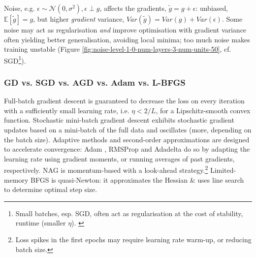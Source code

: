 Noise, e.g. $\epsilon \sim \mathcal{N}(0, \sigma^2), \epsilon \perp g$,
affects the gradients, $\tilde{g} = g + \epsilon$:
unbiased, $\mathbb{E}[\tilde{g}] = g$,
but higher \textit{gradient} variance, $Var(\tilde{g}) = Var(g) + Var(\epsilon)$.
Some noise may act as regularisation \textit{and} improve optimisation \citep{neelakantan2015addinggradientnoiseimproves}
with gradient variance often yielding better generalisation, avoiding local minima;
too much noise makes training unstable (Figure \ref{fig:noise-level-1-0-num-layers-3-num-units-50}, cf. SGD\footnote{
    Small batches, esp. SGD, often act as regularisation at the cost of stability, runtime (smaller $\eta$). \citep{Goodfellowetal2016}
}).

\subsubsection{GD vs. SGD vs. AGD vs. Adam vs. L-BFGS}
\label{subsubsection:gd-vs-sgd-vs-agd-vs-adam-vs-lbfgs}

Full-batch gradient descent is guaranteed to decrease the loss on every iteration
with a sufficiently small learning rate, i.e. $\eta < 2 / L$,
for a Lipschitz-smooth convex function.
Stochastic mini-batch gradient descent exhibits stochastic gradient updates
based on a mini-batch of the full data and oscillates (more, depending on the batch size).
Adaptive methods and second-order approximations are designed to accelerate convergence:
Adam \citep{kingma2017adammethodstochasticoptimization}, RMSProp \citep{hinton2012rmsprop} and Adadelta \citep{zeiler2012adadeltaadaptivelearningrate}
do so by adapting the learning rate using gradient moments,
or running averages of past gradients, respectively.
NAG \citep{nesterov1983method} is momentum-based with a look-ahead strategy.\footnote{
    Loss spikes in the first epochs may require learning rate warm-up, or reducing batch size.
}
Limited-memory BFGS \citep{byrd1995limited} is quasi-Newton: it approximates the Hessian
\& uses line search to determine optimal step size.

